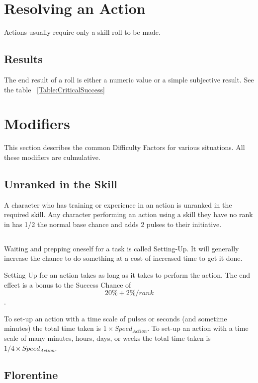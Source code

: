 \section{Resolving an Action}

Actions usually require only a skill roll to be made. 

\subsection{Results}

The end result of a roll is either a numeric value or a simple 
subjective result. See the table ~\ref{Table:CriticalSuccess}

\section{Modifiers} 

This section describes the common Difficulty Factors for various 
situations. All these modifiers are culmulative.

\subsection{Unranked in the Skill}

A character who has training or experience in an action is
unranked in the required skill. Any character performing an action using 
a skill they have no rank in has 1/2 the normal base chance and adds 2 pulses to 
their initiative. 

\subsection{}

Waiting and prepping oneself for a task is called Setting-Up. It will generally increase 
the chance to do something at a cost of increased time to get it done.

Setting Up for an action takes as long as it takes to perform the action. The end effect is a
bonus to the Success Chance of \[ 20\% + 2\%/rank\]. 

To set-up an action with a time scale of pulses or seconds (and sometime minutes) the total time taken is \( 1 \times Speed_{Action} \).
To set-up an action with a time scale of many minutes, hours, days, or weeks the total time taken is \( 1/4 \times Speed_{Action} \).  

\subsection{Florentine}

